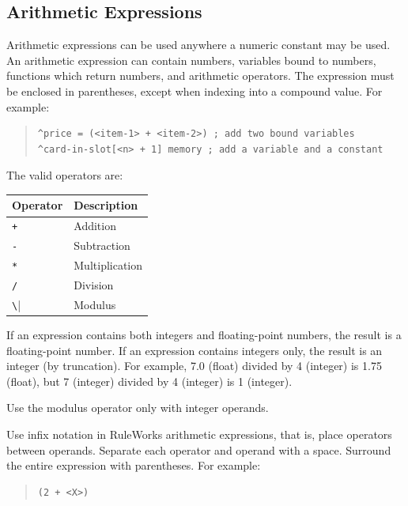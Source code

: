 \subsection{Arithmetic Expressions}

Arithmetic expressions can be used anywhere a numeric constant may be
used. An arithmetic expression can contain numbers, variables bound to
numbers, functions which return numbers, and arithmetic operators. The
expression must be enclosed in parentheses, except when indexing into
a compound value. For example:

\begin{quote}
\begin{verbatim}
^price = (<item-1> + <item-2>) ; add two bound variables
^card-in-slot[<n> + 1] memory ; add a variable and a constant
\end{verbatim}
\end{quote}

The valid operators are:

\begin{center}
  \begin{tabular}{ll}
    \toprule
    Operator & Description    \\
    \midrule
    \verb|+|  & Addition       \\
    \verb|-|  & Subtraction    \\
    \verb|*|  & Multiplication \\
    \verb|/|  & Division       \\
    \verb|\|  & Modulus        \\
    \bottomrule
  \end{tabular}
\end{center}

If an expression contains both integers and floating-point numbers,
the result is a floating-point number. If an expression contains
integers only, the result is an integer (by truncation). For example,
7.0 (float) divided by 4 (integer) is 1.75 (float), but 7 (integer)
divided by 4 (integer) is 1 (integer).

\begin{note}
Use the modulus operator only with integer operands.
\end{note}

Use infix notation in RuleWorks arithmetic expressions, that is, place
operators between operands. Separate each operator and operand with a
space. Surround the entire expression with parentheses. For example:

\begin{quote}
\begin{verbatim}
(2 + <X>)
\end{verbatim}
\end{quote}

